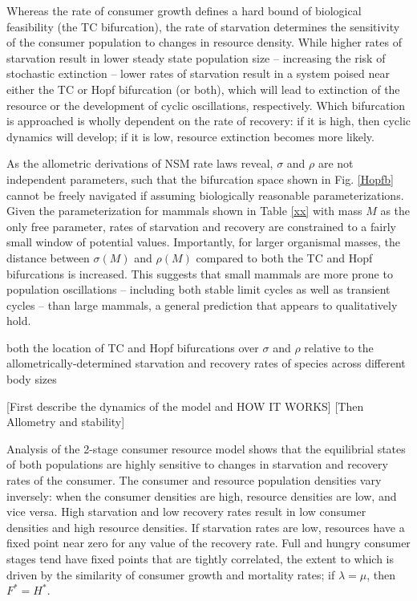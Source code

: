 \documentclass[12pt,english]{article}
\begin{document}
\begin{spacing}{1.9}
Whereas the rate of consumer growth defines a hard bound of biological feasibility (the TC bifurcation), the rate of starvation determines the sensitivity of the consumer population to changes in resource density.
While higher rates of starvation result in lower steady state population size -- increasing the risk of stochastic extinction -- lower rates of starvation result in a system poised near either the TC or Hopf bifurcation (or both), which will lead to extinction of the resource or the development of cyclic oscillations, respectively.
Which bifurcation is approached is wholly dependent on the rate of recovery: if it is high, then cyclic dynamics will develop; if it is low, resource extinction becomes more likely.




As the allometric derivations of NSM rate laws reveal, $\sigma$ and $\rho$ are not independent parameters, such that the bifurcation space shown in Fig. \ref{Hopfb} cannot be freely navigated if assuming biologically reasonable parameterizations.
Given the parameterization for mammals shown in Table \ref{xx} with mass $M$ as the only free parameter, rates of starvation and recovery are constrained to a fairly small window of potential values.
Importantly, for larger organismal masses, the distance between $\sigma(M)$ and $\rho(M)$ compared to both the TC and Hopf bifurcations is increased.
This suggests that small mammals are more prone to population oscillations -- including both stable limit cycles as well as transient cycles -- than large mammals, a general prediction that appears to qualitatively hold.





both the location of TC and Hopf bifurcations over $\sigma$ and $\rho$ relative to the allometrically-determined starvation and recovery rates of species across different body sizes 

[First describe the dynamics of the model and HOW IT WORKS]
[Then Allometry and stability]

Analysis of the 2-stage consumer resource model shows that the equilibrial states of both populations are highly sensitive to changes in  starvation and recovery rates of the consumer.
The consumer and resource population densities vary inversely: when the consumer densities are high, resource densities are low, and vice versa.
High starvation and low recovery rates result in low consumer densities and high resource densities. %
If starvation rates are low, resources have a fixed point near zero for any value of the recovery rate.
Full and hungry consumer stages tend have fixed points that are tightly correlated, the extent to which is driven by the similarity of consumer growth and mortality rates; if $\lambda = \mu$, then $F^* = H^*$.


\end{spacing}
\end{document}
